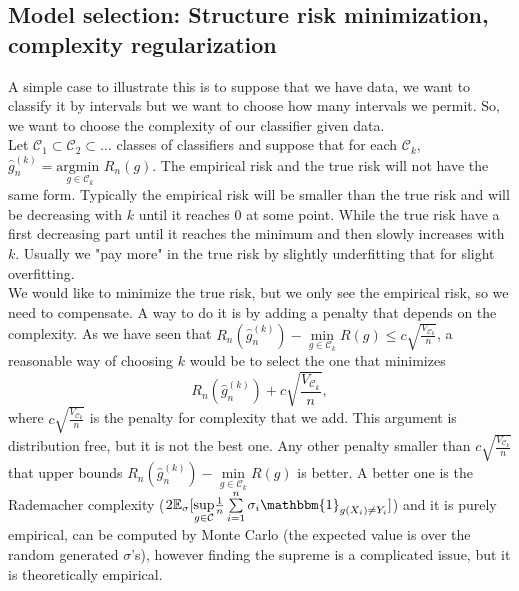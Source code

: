 \documentclass[11pt, english]{article}
\newcommand{\su}[2]{\sum\limits_{#1}^{#2}}
\begin{document}
\subsection{Model selection: Structure risk minimization, complexity regularization}
A simple case to illustrate this is to suppose that we have data, we want to classify it by intervals but we want to choose how many intervals we permit. So, we want to choose the complexity of our classifier given data. \\

Let $\mathcal{C}_1\subset \mathcal{C}_2\subset\dots$ classes of classifiers and suppose that for each $\mathcal{C}_k$, $\hat{g}_n^{(k)}=\underset{g\in\mathcal{C}_k}{\text{argmin }}R_n(g)$. The empirical risk and the true risk will not have the same form. Typically the empirical risk will be smaller than the true risk and will be decreasing with $k$ until it reaches 0 at some point. While the true risk have a first decreasing part until it reaches the minimum and then slowly increases with $k$. Usually we "pay more" in the true risk by slightly underfitting that for slight overfitting.\\

We would like to minimize the true risk, but we only see the empirical risk, so we need to compensate. A way to do it is by adding a penalty that depends on the complexity. As we have seen that $R_n(\hat{g}_n^{(k)})-\underset{g\in \mathcal{C}_k}{\min}R(g)\leq c\sqrt{\frac{V_{\mathcal{C}_k}}{n}}$, a reasonable way of choosing $k$ would be to select the one that minimizes 
\begin{equation}
	R_n(\hat{g}_n^{(k)})+c\sqrt{\frac{V_{\mathcal{C}_k}}{n}},
\end{equation}
where $c\sqrt{\frac{V_{\mathcal{C}_k}}{n}}$ is the penalty for complexity that we add. This argument is distribution free, but it is not the best one. Any other penalty smaller than $c\sqrt{\frac{V_{\mathcal{C}_k}}{n}}$ that upper bounds $R_n(\hat{g}_n^{(k)})-\underset{g\in \mathcal{C}_k}{\min}R(g)$ is better. A better one is the Rademacher complexity ($2\mathbb{E}_{\sigma}[\underset{g\in\mathcal{C}}{\sup}\frac{1}{n}\su{i=1}{n}\sigma_i\mathbbm{1}_{g(X_i)\neq Y_i}]$) and it is purely empirical, can be computed by Monte Carlo (the expected value is over the random generated $\sigma$'s), however finding the supreme is a complicated issue, but it is theoretically empirical.
\end{document}
